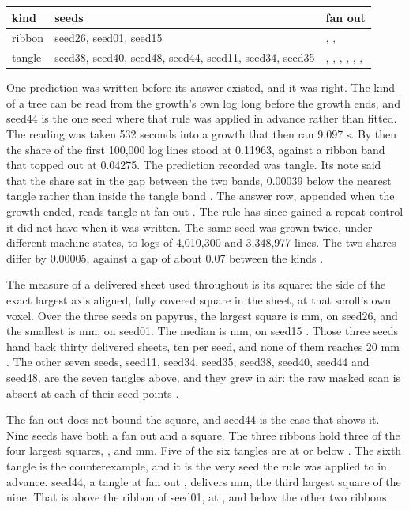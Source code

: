 \begin{table}[t]
\centering
\small
\begin{tabularx}{\textwidth}{XXX}
\toprule
kind & seeds & fan out \\
\midrule
ribbon & seed26, seed01, seed15 & \FanOutSeedTwentySix{}, \FanOutSeedOne{}, \FanOutSeedFifteen{} \\
tangle & seed38, seed40, seed48, seed44, seed11, seed34, seed35 & \FanOutSeedThirtyEight{}, \FanOutSeedForty{}, \FanOutSeedFortyEight{}, \FanOutSeedFortyFour{}, \FanOutSeedEleven{}, \FanOutSeedThirtyFour{}, \FanOutSeedThirtyFive{} \\
\bottomrule
\end{tabularx}
\end{table}

One prediction was written before its answer existed, and it was right. The kind of a tree can be read from the growth's own log long before the growth ends, and seed44 is the one seed where that rule was applied in advance rather than fitted. The reading was taken 532 seconds into a growth that then ran 9,097 s. By then the share of the first 100,000 log lines stood at 0.11963, against a ribbon band that topped out at 0.04275. The prediction recorded was tangle. Its note said that the share sat in the gap between the two bands, 0.00039 below the nearest tangle rather than inside the tangle band {}. The answer row, appended when the growth ended, reads tangle at fan out \FanOutSeedFortyFour{}. The rule has since gained a repeat control it did not have when it was written. The same seed was grown twice, under different machine states, to logs of 4,010,300 and 3,348,977 lines. The two shares differ by 0.00005, against a gap of about 0.07 between the kinds {}.

The measure of a delivered sheet used throughout is its square: the side of the exact largest axis aligned, fully covered square in the sheet, at that scroll's own voxel. Over the three seeds on papyrus, the largest square is \SeedSquareTwentySix{} mm, on seed26, and the smallest is \SeedSquareOne{} mm, on seed01. The median is \SeedSquareFifteen{} mm, on seed15 {}. Those three seeds hand back thirty delivered sheets, ten per seed, and none of them reaches 20 mm {}. The other seven seeds, seed11, seed34, seed35, seed38, seed40, seed44 and seed48, are the seven tangles above, and they grew in air: the raw masked scan is absent at each of their seed points {}.

The fan out does not bound the square, and seed44 is the case that shows it. Nine seeds have both a fan out and a square. The three ribbons hold three of the four largest squares, \SeedSquareTwentySix{}, \SeedSquareFifteen{} and \SeedSquareOne{} mm. Five of the six tangles are at or below \SeedSquareThirtyEight{} {}. The sixth tangle is the counterexample, and it is the very seed the rule was applied to in advance. seed44, a tangle at fan out \FanOutSeedFortyFour{}, delivers \SeedSquareFortyFour{} mm, the third largest square of the nine. That is above the ribbon of seed01, at \SeedSquareOne{}, and below the other two ribbons.

